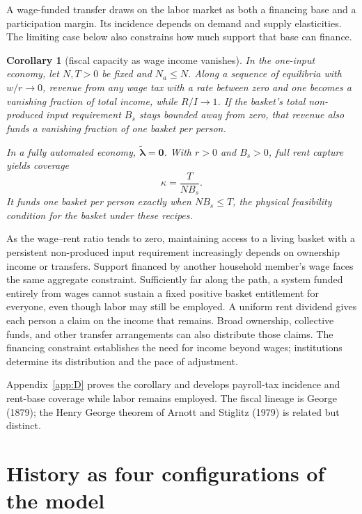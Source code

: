 \documentclass[12pt]{article}
\theoremstyle{plain}
\newtheorem*{corollary}{Corollary}
\begin{document}
A wage-funded transfer draws on the labor market as both a financing base and a participation margin. Its incidence depends on demand and supply elasticities. The limiting case below also constrains how much support that base can finance.

\begin{corollary}[fiscal capacity as wage income vanishes]
In the one-input economy, let $N,T>0$ be fixed and $N_a\le N$. Along a sequence of equilibria with $w/r\to0$, revenue from any wage tax with a rate between zero and one becomes a vanishing fraction of total income, while $R/I\to1$. If the basket's total non-produced input requirement $B_s$ stays bounded away from zero, that revenue also funds a vanishing fraction of one basket per person.

In a fully automated economy, $\widetilde{\bm\lambda}=\mathbf{0}$. With $r>0$ and $B_s>0$, full rent capture yields coverage
\begin{equation}\label{eq:17}
\kappa=\frac{T}{NB_s}.
\end{equation}
It funds one basket per person exactly when $NB_s\le T$, the physical feasibility condition for the basket under these recipes.
\end{corollary}

As the wage--rent ratio tends to zero, maintaining access to a living basket with a persistent non-produced input requirement increasingly depends on ownership income or transfers. Support financed by another household member's wage faces the same aggregate constraint. Sufficiently far along the path, a system funded entirely from wages cannot sustain a fixed positive basket entitlement for everyone, even though labor may still be employed. A uniform rent dividend gives each person a claim on the income that remains. Broad ownership, collective funds, and other transfer arrangements can also distribute those claims. The financing constraint establishes the need for income beyond wages; institutions determine its distribution and the pace of adjustment.

Appendix~\ref{app:D} proves the corollary and develops payroll-tax incidence and rent-base coverage while labor remains employed. The fiscal lineage is George (1879); the Henry George theorem of Arnott and Stiglitz (1979) is related but distinct.

\section{History as four configurations of the model}\label{sec:8}
\end{document}
